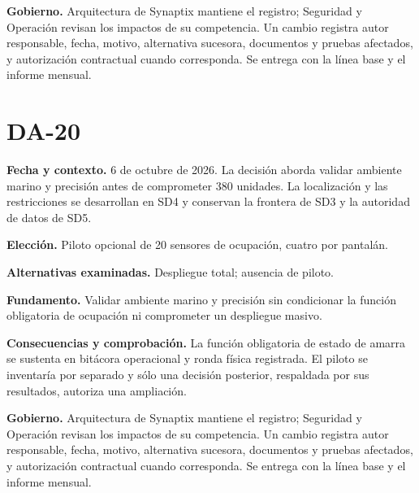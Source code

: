 \documentclass[11pt,letterpaper]{report}
\begin{document}
\textbf{Gobierno.} Arquitectura de Synaptix mantiene el registro; Seguridad y Operación revisan los impactos de su competencia. Un cambio registra autor responsable, fecha, motivo, alternativa sucesora, documentos y pruebas afectados, y autorización contractual cuando corresponda. Se entrega con la línea base y el informe mensual.

\section*{DA-20}

\textbf{Fecha y contexto.} 6 de octubre de 2026. La decisión aborda validar ambiente marino y precisión antes de comprometer 380 unidades. La localización y las restricciones se desarrollan en SD4 y conservan la frontera de SD3 y la autoridad de datos de SD5.

\textbf{Elección.} Piloto opcional de 20 sensores de ocupación, cuatro por pantalán.

\textbf{Alternativas examinadas.} Despliegue total; ausencia de piloto.

\textbf{Fundamento.} Validar ambiente marino y precisión sin condicionar la función obligatoria de ocupación ni comprometer un despliegue masivo.

\textbf{Consecuencias y comprobación.} La función obligatoria de estado de amarra se sustenta en bitácora operacional y ronda física registrada. El piloto se inventaría por separado y sólo una decisión posterior, respaldada por sus resultados, autoriza una ampliación.

\textbf{Gobierno.} Arquitectura de Synaptix mantiene el registro; Seguridad y Operación revisan los impactos de su competencia. Un cambio registra autor responsable, fecha, motivo, alternativa sucesora, documentos y pruebas afectados, y autorización contractual cuando corresponda. Se entrega con la línea base y el informe mensual.








\CierreSubdocumento
\end{document}
